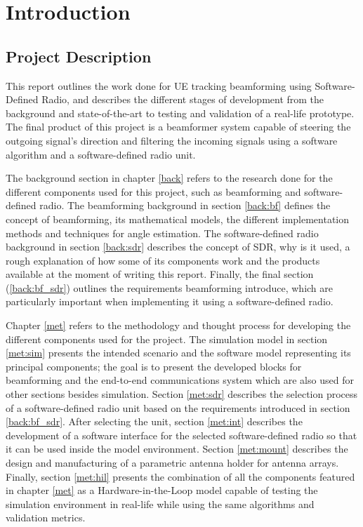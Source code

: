 \documentclass[12pt,a4paper]{report}
\begin{document}
\listoffigures
\listoftables

\tableofcontents

\chapter{Introduction} \label{intro}

\section{Project Description} \label{intro:proj}
This report outlines the work done for UE tracking beamforming using Software-Defined Radio, and describes the different stages of development from the background and state-of-the-art to testing and validation of a real-life prototype. The final product of this project is a beamformer system capable of steering the outgoing signal's direction and filtering the incoming signals using a software algorithm and a software-defined radio unit.

The background section in chapter \ref{back} refers to the research done for the different components used for this project, such as beamforming and software-defined radio. The beamforming background in section \ref{back:bf} defines the concept of beamforming, its mathematical models, the different implementation methods and techniques for angle estimation. The software-defined radio background in section \ref{back:sdr} describes the concept of SDR, why is it used, a rough explanation of how some of its components work and the products available at the moment of writing this report. Finally, the final section (\ref{back:bf_sdr}) outlines the requirements beamforming introduce, which are particularly important when implementing it using a software-defined radio.

Chapter \ref{met} refers to the methodology and thought process for developing the different components used for the project. The simulation model in section \ref{met:sim} presents the intended scenario and the software model representing its principal components; the goal is to present the developed blocks for beamforming and the end-to-end communications system which are also used for other sections besides simulation. Section \ref{met:sdr} describes the selection process of a software-defined radio unit based on the requirements introduced in section \ref{back:bf_sdr}. After selecting the unit, section \ref{met:int} describes the development of a software interface for the selected software-defined radio so that it can be used inside the model environment. Section \ref{met:mount} describes the design and manufacturing of a parametric antenna holder for antenna arrays. Finally, section \ref{met:hil} presents the combination of all the components featured in chapter \ref{met} as a Hardware-in-the-Loop model capable of testing the simulation environment in real-life while using the same algorithms and validation metrics.
\end{document}
